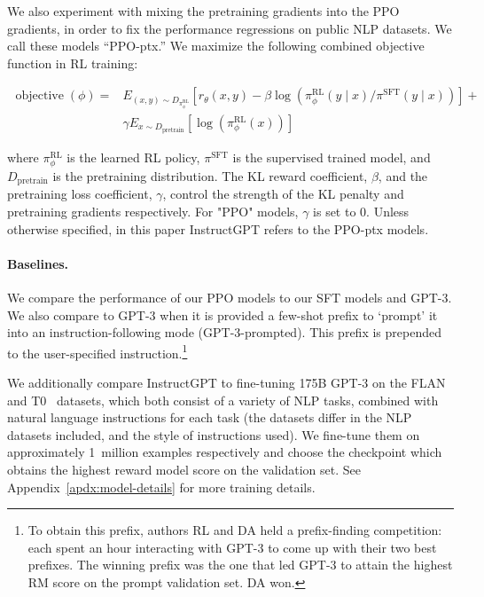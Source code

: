 We also experiment with mixing the pretraining gradients into the PPO gradients, in order to fix the performance regressions on public NLP datasets. We call these models ``PPO-ptx.''  We maximize the following combined objective function in RL training:

\begin{equation} \label{eq2}
\begin{split}
\operatorname{objective}\left(\phi\right)= & E_{\left(x, y\right) \sim D_{\pi_{\phi}^{\mathrm{RL}}}}\left[r_{\theta}(x, y)-\beta \log \left(\pi_{\phi}^{\mathrm{RL}}(y \mid x) / \pi^{\mathrm{SFT}}(y \mid x)\right)\right] + \\
 & \gamma E_{x \sim D_\textrm{pretrain}}\left[\log(\pi_{\phi}^{\mathrm{RL}}(x))\right]
\end{split}
\end{equation}

where \( \pi_{\phi}^{\mathrm{RL}}\) is the learned RL policy, \( \pi^{\mathrm{SFT}}\) is the supervised trained model, and \(D_\textrm{pretrain} \) is the pretraining distribution. The KL reward coefficient, \( \beta \), and the pretraining loss coefficient, \( \gamma \), control the strength of the KL penalty and pretraining gradients respectively. For "PPO" models, \( \gamma \) is set to 0. Unless otherwise specified, in this paper InstructGPT refers to the PPO-ptx models.

\paragraph{Baselines.} We compare the performance of our PPO models to our SFT models and GPT-3. We also compare to GPT-3 when it is provided a few-shot prefix to ‘prompt' it into an instruction-following mode (GPT-3-prompted). This prefix is prepended to the user-specified instruction.\footnote{To obtain this prefix, authors RL and DA held a prefix-finding competition: each spent an hour interacting with GPT-3 to come up with their two best prefixes. The winning prefix was the one that led GPT-3 to attain the highest RM score on the prompt validation set. DA won.}

We additionally compare InstructGPT to fine-tuning 175B GPT-3 on the FLAN~\citep{wei2021finetuned} and T0~\citep{sanh2021multitask} datasets, which both consist of a variety of NLP tasks, combined with natural language instructions for each task (the datasets differ in the NLP datasets included, and the style of instructions used). 
We fine-tune them on approximately 1~million examples respectively and choose the checkpoint which obtains the highest reward model score on the validation set. See Appendix~\ref{apdx:model-details} for more training details.


